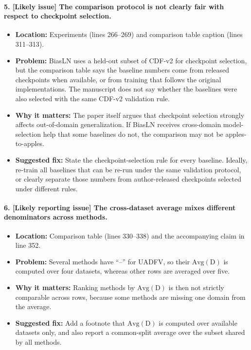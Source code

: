 \documentclass[11pt]{article}
\begin{document}
\paragraph{5. [Likely issue] The comparison protocol is not clearly fair with respect to checkpoint selection.}
\begin{itemize}
    \item \textbf{Location:} Experiments (lines 266--269) and comparison table caption (lines 311--313).
    \item \textbf{Problem:} BiasLN uses a held-out subset of CDF-v2 for checkpoint selection, but the comparison table says the baseline numbers come from released checkpoints when available, or from training that follows the original implementations. The manuscript does not say whether the baselines were also selected with the same CDF-v2 validation rule.
    \item \textbf{Why it matters:} The paper itself argues that checkpoint selection strongly affects out-of-domain generalization. If BiasLN receives cross-domain model-selection help that some baselines do not, the comparison may not be apples-to-apples.
    \item \textbf{Suggested fix:} State the checkpoint-selection rule for every baseline. Ideally, re-train all baselines that can be re-run under the same validation protocol, or clearly separate those numbers from author-released checkpoints selected under different rules.
\end{itemize}

\paragraph{6. [Likely reporting issue] The cross-dataset average mixes different denominators across methods.}
\begin{itemize}
    \item \textbf{Location:} Comparison table (lines 330--338) and the accompanying claim in line 352.
    \item \textbf{Problem:} Several methods have ``--'' for UADFV, so their $\mathrm{Avg(D)}$ is computed over four datasets, whereas other rows are averaged over five.
    \item \textbf{Why it matters:} Ranking methods by $\mathrm{Avg(D)}$ is then not strictly comparable across rows, because some methods are missing one domain from the average.
    \item \textbf{Suggested fix:} Add a footnote that $\mathrm{Avg(D)}$ is computed over available datasets only, and also report a common-split average over the subset shared by all methods.
\end{itemize}
\end{document}
